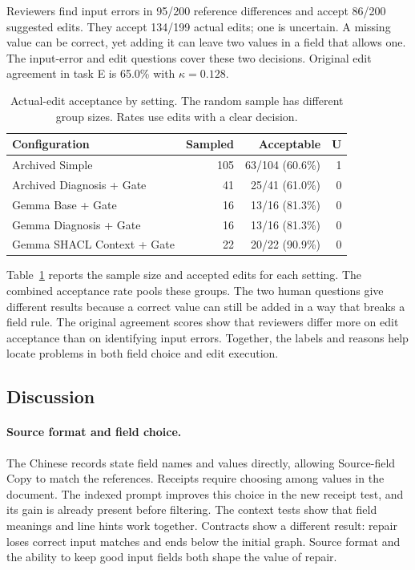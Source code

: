 Reviewers find input errors in 95/200 reference differences and accept
86/200 suggested edits. They accept 134/199 actual edits; one is uncertain.
A missing value can be correct, yet adding it can leave two values in a
field that allows one. The input-error and edit questions cover these
two decisions. Original edit agreement in task E is 65.0\% with
$\kappa=0.128$.

\begin{table}[t]
\centering
\caption{Actual-edit acceptance by setting. The random sample has different group sizes. Rates use edits with a clear decision.}
\label{tab:human_review_by_config}
\small
\begin{tabular}{lrrr}
\toprule
Configuration & Sampled & Acceptable & U \\
\midrule
Archived Simple & 105 & 63/104 (60.6\%) & 1 \\
Archived Diagnosis + Gate & 41 & 25/41 (61.0\%) & 0 \\
Gemma Base + Gate & 16 & 13/16 (81.3\%) & 0 \\
Gemma Diagnosis + Gate & 16 & 13/16 (81.3\%) & 0 \\
Gemma SHACL Context + Gate & 22 & 20/22 (90.9\%) & 0 \\
\bottomrule
\end{tabular}
\end{table}

Table~\ref{tab:human_review_by_config} reports the sample size and accepted
edits for each setting. The combined acceptance rate pools these groups.
The two human questions give different results because a correct value
can still be added in a way that breaks a field rule.
The original agreement scores show that reviewers differ more on edit
acceptance than on identifying input errors. Together, the labels and
reasons help locate problems in both field choice and edit execution.

\subsection{Discussion}
\label{sec:eval:failure}

\paragraph{Source format and field choice.}
The Chinese records state field names and values directly, allowing
Source-field Copy to match the references. Receipts require choosing
among values in the document. The indexed prompt improves this choice
in the new receipt test, and its gain is already present before filtering.
The context tests show that field meanings and line hints work together.
Contracts show a different result: repair loses correct input matches
and ends below the initial graph. Source format and the ability to keep
good input fields both shape the value of repair.


